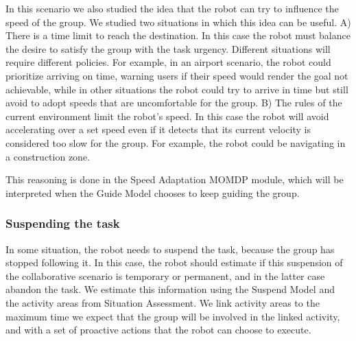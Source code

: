 In this scenario we also studied the idea that the robot can try to influence the speed of the group. We studied two situations in which this idea can be useful. A) There is a time limit to reach the destination. In this case the robot must balance the desire to satisfy the group with the task urgency. Different situations will require different policies. For example, in an airport scenario, the robot could prioritize arriving on time, warning users if their speed would render the goal not achievable, while in other situations the robot could try to arrive in time but still avoid to adopt speeds that are uncomfortable for the group. B) The rules of the current environment limit the robot's speed. In this case the robot will avoid accelerating over a set speed even if it detects that its current velocity is considered too slow for the group. For example, the robot could be navigating in a construction zone.

This reasoning is done in the Speed Adaptation MOMDP module, which will be interpreted when the Guide Model chooses to keep guiding the group.

\vspace{-5pt}
\subsubsection{Suspending the task}
In some situation, the robot needs to suspend the task, because the group has stopped following it. In this case, the robot should estimate if this suspension of the collaborative scenario is temporary or permanent, and in the latter case abandon the task. We estimate this information using the Suspend Model and the activity areas from Situation Assessment. We link activity areas to the maximum time we expect that the group will be involved in the linked activity, and with a set of proactive actions that the robot can choose to execute.


